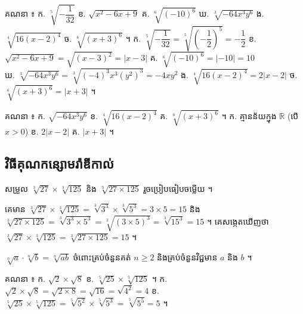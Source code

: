 \begin{example}[លំហាត់គំរូ]
គណនា ៖ \quad ក. $\sqrt[5]{-\dfrac{1}{32}}$ \quad ខ. $\sqrt{x^2 - 6x + 9}$ \quad គ. $\sqrt[6]{(-10)^6}$ \quad ឃ. $\sqrt[3]{-64x^3y^6}$ \quad ង. $\sqrt[4]{16(x-2)^4}$ \quad ច. $\sqrt[6]{(x+3)^6}$ ។
\ans
ក. $\sqrt[5]{-\dfrac{1}{32}} = \sqrt[5]{\left(-\dfrac{1}{2}\right)^5} = -\dfrac{1}{2}$ \quad ខ. $\sqrt{x^2 - 6x + 9} = \sqrt{(x-3)^2} = |x - 3|$ \quad គ. $\sqrt[6]{(-10)^6} = |-10| = 10$\\
ឃ. $\sqrt[3]{-64x^3y^6} = \sqrt[3]{(-4)^3x^3(y^2)^3} = -4xy^2$ \quad ង. $\sqrt[4]{16(x-2)^4} = 2|x - 2|$ \quad ច. $\sqrt[6]{(x+3)^6} = |x + 3|$ ។
\end{example}

\begin{pro}
គណនា ៖ \quad ក. $\sqrt{-64x^3y^6}$ \quad ខ. $\sqrt[4]{16(x-2)^4}$ \quad គ. $\sqrt[6]{(x+3)^6}$ ។
\ans
ក. គ្មានន័យក្នុង $\mathbb{R}$ (បើ $x > 0$) \quad ខ. $2|x - 2|$ \quad គ. $|x + 3|$ ។
\end{pro}

\subsection{វិធីគុណកន្សោមរ៉ាឌីកាល់}
\begin{example}[ឧទាហរណ៍]
សម្រួល $\sqrt[3]{27}\times\sqrt[3]{125}$ និង $\sqrt[3]{27\times 125}$ រួចប្រៀបធៀបចម្លើយ ។
\end{example}
គេមាន $\sqrt[3]{27}\times\sqrt[3]{125} = \sqrt[3]{3^3}\times\sqrt[3]{5^3} = 3\times 5 = 15$ និង $\sqrt[3]{27\times 125} = \sqrt[3]{3^3\times 5^3} = \sqrt[3]{(3\times 5)^3} = \sqrt[3]{15^3} = 15$ ។ គេសង្កេតឃើញថា $\sqrt[3]{27}\times\sqrt[3]{125} = \sqrt[3]{27\times 125} = 15$ ។
\begin{formulaBox}[ជាទូទៅ]
$\sqrt[n]{a}\cdot\sqrt[n]{b} = \sqrt[n]{ab}$ ចំពោះគ្រប់ចំនួនគត់ $n \ge 2$ និងគ្រប់ចំនួនវិជ្ជមាន $a$ និង $b$ ។
\end{formulaBox}
\begin{example}[លំហាត់គំរូ]
គណនា ៖ \quad ក. $\sqrt{2}\times\sqrt{8}$ \quad ខ. $\sqrt[5]{25}\times\sqrt[5]{125}$ ។
\ans
ក. $\sqrt{2}\times\sqrt{8} = \sqrt{2\times 8} = \sqrt{16} = \sqrt{4^2} = 4$ \quad ខ. $\sqrt[5]{25}\times\sqrt[5]{125} = \sqrt[5]{5^2}\times\sqrt[5]{5^3} = \sqrt[5]{5^5} = 5$ ។
\end{example}

